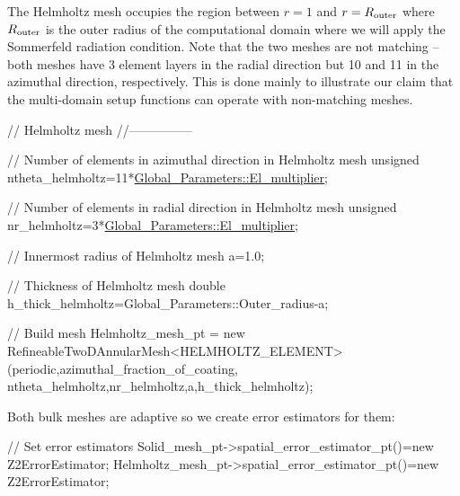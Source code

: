 The Helmholtz mesh occupies the region between $ r = 1 $ and $ r=R_{\rm outer} $ where $ R_{\rm outer}$ is the outer radius of the computational domain where we will apply the Sommerfeld radiation condition. Note that the two meshes are not matching -- both meshes have 3 element layers in the radial direction but 10 and 11 in the azimuthal direction, respectively. This is done mainly to illustrate our claim that the multi-\/domain setup functions can operate with non-\/matching meshes.


\begin{DoxyCodeInclude}
 
 
 \textcolor{comment}{// Helmholtz mesh}
 \textcolor{comment}{//---------------}

 \textcolor{comment}{// Number of elements in azimuthal direction in Helmholtz mesh}
 \textcolor{keywordtype}{unsigned} ntheta\_helmholtz=11*\hyperlink{namespaceGlobal__Parameters_a35d5d2ecfff0cec6150a5dc79e5c1ad1}{Global\_Parameters::El\_multiplier};

 \textcolor{comment}{// Number of elements in radial direction in Helmholtz mesh}
 \textcolor{keywordtype}{unsigned} nr\_helmholtz=3*\hyperlink{namespaceGlobal__Parameters_a35d5d2ecfff0cec6150a5dc79e5c1ad1}{Global\_Parameters::El\_multiplier};

 \textcolor{comment}{// Innermost radius of Helmholtz mesh}
 a=1.0;
 
 \textcolor{comment}{// Thickness of Helmholtz mesh}
 \textcolor{keywordtype}{double} h\_thick\_helmholtz=Global\_Parameters::Outer\_radius-a;

 \textcolor{comment}{// Build mesh}
 Helmholtz\_mesh\_pt = \textcolor{keyword}{new} 
  RefineableTwoDAnnularMesh<HELMHOLTZ\_ELEMENT>
  (periodic,azimuthal\_fraction\_of\_coating,
   ntheta\_helmholtz,nr\_helmholtz,a,h\_thick\_helmholtz);

\end{DoxyCodeInclude}


Both bulk meshes are adaptive so we create error estimators for them\+:


\begin{DoxyCodeInclude}


 \textcolor{comment}{// Set error estimators}
 Solid\_mesh\_pt->spatial\_error\_estimator\_pt()=\textcolor{keyword}{new} Z2ErrorEstimator;
 Helmholtz\_mesh\_pt->spatial\_error\_estimator\_pt()=\textcolor{keyword}{new} Z2ErrorEstimator;

\end{DoxyCodeInclude}


